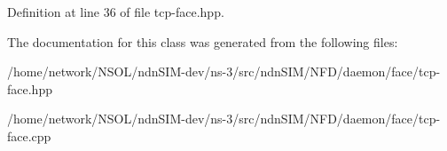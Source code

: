 Definition at line 36 of file tcp-\/face.\+hpp.



The documentation for this class was generated from the following files\+:\begin{DoxyCompactItemize}
\item 
/home/network/\+N\+S\+O\+L/ndn\+S\+I\+M-\/dev/ns-\/3/src/ndn\+S\+I\+M/\+N\+F\+D/daemon/face/tcp-\/face.\+hpp\item 
/home/network/\+N\+S\+O\+L/ndn\+S\+I\+M-\/dev/ns-\/3/src/ndn\+S\+I\+M/\+N\+F\+D/daemon/face/tcp-\/face.\+cpp\end{DoxyCompactItemize}
